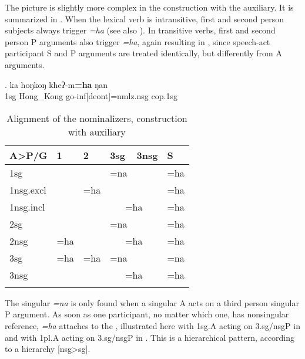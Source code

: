  
The picture is slightly more complex in the construction with the auxiliary. It is summarized in 
. When the lexical verb is intransitive, first and second person subjects always trigger \emph{=ha} (see also \Next). In transitive verbs, first and second person P arguments also trigger \emph{=ha}, again resulting in  , since speech-act participant S and P arguments are treated identically, but differently from A arguments. 

\exg. ka hoŋkoŋ kheʔ-m{\bf =ha} ŋan\\
{\sc 1sg} Hong\_Kong go-{\sc inf[deont]=nmlz.nsg} {\sc cop.1sg}\\


\begin{table}[htp]
\begin{center}
\begin{tabular}{llllll}
\lsptoprule
{\bf A>P/G} 	&	1&2&{\sc 3sg}&{\sc 3nsg}&S\\
\midrule
{\sc }1sg  		& \cellcolor[gray]{.8}&&=na &  &=ha \\
 {\sc 1nsg.excl}   &	\cellcolor[gray]{.8}&=ha 				&\multicolumn{2}{c}{}&=ha\\
{\sc 1nsg.incl}   	&\multicolumn{2}{c}{\cellcolor[gray]{.8}}		& \multicolumn{2}{c}{=ha}&=ha\\
\midrule
{\sc 2sg}  		&    & \cellcolor[gray]{.8}	&=na& & =ha\\
{\sc 2nsg}  		& =ha  & \cellcolor[gray]{.8}	&\multicolumn{2}{c}{=ha}&=ha\\
\midrule
{\sc 3sg}  	& =ha&=ha &=na&&=na\\
{\sc 3nsg} 	&	& 	&\multicolumn{2}{c}{=ha}&=ha \\
\lspbottomrule
\end{tabular}
\caption{Alignment  of the nominalizers, construction with auxiliary}\label{nom-align}
\end{center}
\end{table}

The singular  \emph{=na} is only found when a singular A acts on a third person singular P argument. As soon as one participant, no matter which one, has nonsingular reference, \emph{=ha} attaches to the , illustrated here with {\sc 1sg.A} acting on {\sc 3.sg/nsgP} in \Next and with {\sc 1pl.A} acting on {\sc 3.sg/nsgP}  in \NNext. This is a hierarchical pattern, according to a  hierarchy [nsg>sg].

